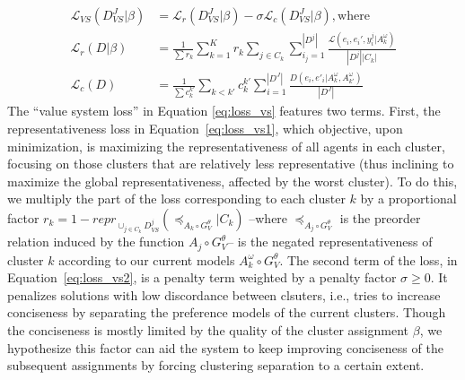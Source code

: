 \documentclass{ecai}
\newcommand{\abs}[1]{{\left|#1\right|}}
\begin{document}
\iffalse
{}
\begin{align}\label{eq:loss_vs}
    \mathcal{L}_{VS}(D_{VS}^J|\beta) &= \mathcal{L}_{r}(D_{VS}^J|\beta) - \sigma\mathcal{L}_{c}(D_{VS}^J|\beta),\text{where} \\
    \label{eq:loss_vs1}\mathcal{L}_r(D|\beta) &=\frac{1}{\sum r_k}\sum_{k=1}^K r_k \sum_{j\in C_k}\sum_{i_j=1}^{\abs{D^j}}\frac{\mathcal{L}(e_i,e_i',y_i^j|A_k^\omega)}{\abs{D^j}\abs{C_k}}\\
    \label{eq:loss_vs2}\mathcal{L}_c(D) &=\frac{1}{\sum c_k^{k'}}\sum_{k<k'} c_k^{k'} \sum_{i=1}^{\abs{D^J}}\frac{D(e_i,e'_i|A_k^\omega,A_{k'}^\omega)}{{\abs{D^J}}}
\end{align}
The ``value system loss'' in Equation \ref{eq:loss_vs} features two terms. First, the representativeness loss in Equation~\ref{eq:loss_vs1}, which objective, upon minimization, is maximizing the representativeness of all agents in each cluster, focusing on those clusters that are relatively less representative (thus inclining to maximize the global representativeness, affected by the worst cluster). To do this, we multiply the part of the loss corresponding to each cluster $k$ by a proportional factor $r_k = 1-repr_{\cup_{j\in C_k}D_{VS}^j}\left(\preccurlyeq_{A_k \circ G^\theta_V}|C_k\right)$ --where $\preccurlyeq_{A_j \circ G^\theta_V}$ is the preorder relation induced by the function $A_j \circ G^\theta_V$-- is the negated representativeness of cluster $k$ according to our current models $A^\omega_k\circ G^\theta_V$. The second term of the loss, in Equation~\ref{eq:loss_vs2}, is a penalty term weighted by a penalty factor $\sigma \geq 0$. It penalizes solutions with low discordance between clsuters, i.e., tries to increase conciseness by separating the preference models of the current clusters. Though the conciseness is mostly limited by the quality of the cluster assignment $\beta$, we hypothesize this factor can aid the system to keep improving conciseness of the subsequent assignments by forcing clustering separation to a certain extent. 
\end{document}
